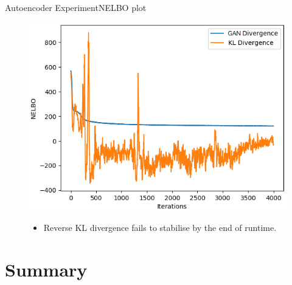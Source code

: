 \documentclass[handout]{beamer}
\begin{document}
\begin{frame}{Autoencoder Experiment}{NELBO plot}
\begin{figure}
\includegraphics[width=0.49\linewidth]{part4nelbos/PCADVvsPCKLD.png}
\begin{itemize}
\vspace{0.3cm}
\item Reverse KL divergence fails to stabilise by the end of runtime.
\end{itemize}
\end{figure}

\end{frame}



\section*{Summary}
\end{document}
